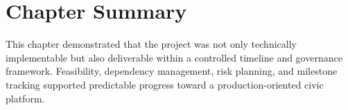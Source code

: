 \section{Chapter Summary}

This chapter demonstrated that the project was not only technically implementable but also deliverable within a controlled timeline and governance framework. Feasibility, dependency management, risk planning, and milestone tracking supported predictable progress toward a production-oriented civic platform.

